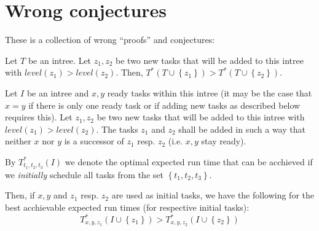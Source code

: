 \section{Wrong conjectures}

These is a collection of wrong ``proofs'' and conjectures:

\begin{conjecture}
  Let $T$ be an intree. Let $z_1, z_2$ be two new tasks that will be added to this intree with $level(z_1) > level(z_2)$. Then, $T^*\left(T\cup\left\{ z_1 \right\}\right) > T^*\left( T\cup\left\{ z_2 \right\} \right)$.
\end{conjecture}

\begin{lemma}
  \label{lem:p3-adding-tasks-level-keep-scheduled-same-inequality}
  Let $I$ be an intree and $x, y$ ready tasks within this intree (it may be the case that $x=y$ if there is only one ready task or if adding new tasks as described below requires this). Let $z_1, z_2$ be two new tasks that will be added to this intree with $level(z_1) > level(z_2)$. The tasks $z_1$ and $z_2$ shall be added in such a way that neither $x$ nor $y$ is a successor of $z_1$ resp. $z_2$ (i.e. $x,y$ stay ready). 
  
  By $T^*_{t_1,t_2,t_3}(I)$ we denote the optimal expected run time that can be acchieved if we \emph{initially} schedule all tasks from the set $\left\{ t_1,t_2,t_3 \right\}$.
  
  Then, if $x,y$ and $z_1$ resp. $z_2$ are used as initial tasks, we have the following for the best acchievable expected run times (for respective initial tasks):
  \begin{equation}
    \label{eq:lemma-p3-adding-tasks-level-keep-scheduled-same-inequality}
    T^{*}_{x,y,z_1}\left(I\cup\left\{ z_1 \right\}\right) > T^{*}_{x,y,z_2}\left( I\cup\left\{ z_2 \right\} \right)
  \end{equation}
\end{lemma}


